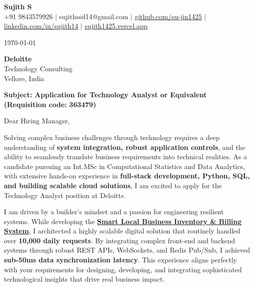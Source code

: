 \documentclass[a4paper,11pt]{article}
\newcommand{\ulink}[2]{\href{#1}{#2}}
\begin{document}
\pagestyle{empty}

\begin{center}
{\color[HTML]{000000}\fontsize{30}{35}\selectfont\bfseries Sujith S} \\[5pt]
{\fontsize{10.5}{12.5}\selectfont\textcolor[HTML]{3A3A3A}{+91 9843579926 $|$ sujithssd14@gmail.com $|$ \ulink{https://github.com/su-jin1425}{github.com/su-jin1425} $|$ \ulink{https://linkedin.com/in/sujith14}{linkedin.com/in/sujith14} $|$ \ulink{https://sujith1425.vercel.app}{sujith1425.vercel.app}}}
\end{center}

\vspace{10pt}

\today

\textbf{Deloitte} \\
Technology Consulting \\
Vellore, India

\textbf{Subject: Application for Technology Analyst or Equivalent (Requisition code: 363479)}

Dear Hiring Manager,

Solving complex business challenges through technology requires a deep understanding of \textbf{system integration, robust application controls}, and the ability to seamlessly translate business requirements into technical realities. As a candidate pursuing an Int.MSc in Computational Statistics and Data Analytics, with extensive hands-on experience in \textbf{full-stack development, Python, SQL, and building scalable cloud solutions}, I am excited to apply for the Technology Analyst position at Deloitte.

I am driven by a builder's mindset and a passion for engineering resilient systems. While developing the \ulink{https://github.com/su-jin1425/Smart-Local-Business-Inventory-Billing-System}{\textbf{Smart Local Business Inventory \& Billing System}}, I architected a highly scalable digital solution that routinely handled over \textbf{10,000 daily requests}. By integrating complex front-end and backend systems through robust REST APIs, WebSockets, and Redis Pub/Sub, I achieved \textbf{sub-50ms data synchronization latency}. This experience aligns perfectly with your requirements for designing, developing, and integrating sophisticated technological insights that drive real business impact.
\end{document}
